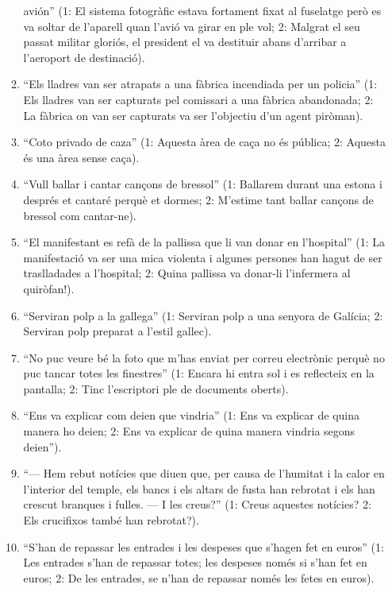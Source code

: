 \begin{enumerate}
\begin{enumerate}
        avión'' (1: El sistema fotogràfic estava fortament fixat al
        fuselatge però es va soltar de l'aparell quan l'avió va girar
        en ple vol; 2: Malgrat el seu passat militar gloriós, el
        president el va destituir abans d'arribar a l'aeroport de
        destinació).
      \item ``Els lladres van ser atrapats a una fàbrica incendiada
      per un policia'' (1: Els lladres van ser capturats pel comissari
      a una fàbrica abandonada; 2: La fàbrica on van ser capturats va
      ser l'objectiu d'un agent piròman).
      \item ``Coto privado de caza'' (1: Aquesta àrea de caça no és pública;
      2: Aquesta és una àrea sense caça).
    \item ``Vull ballar i cantar cançons de bressol'' (1: Ballarem
      durant una estona i després et cantaré perquè et dormes; 2:
      M'estime tant ballar cançons de bressol com cantar-ne).
      \item ``El manifestant es refà de la pallissa que li van donar en
      l'hospital'' (1: La manifestació va ser una mica violenta i
      algunes persones han hagut de ser traslladades a l'hospital; 2:
      Quina pallissa va donar-li l'infermera al quiròfan!).
      \item ``Serviran polp a la gallega'' (1: Serviran polp a una
        senyora de Galícia; 2: Serviran polp preparat a l'estil
        gallec).
      \item ``No puc veure bé la foto que m'has enviat per correu
        electrònic perquè no puc tancar totes les finestres'' (1:
        Encara hi entra sol i es reflecteix en la pantalla; 2: Tinc
        l'escriptori ple de documents oberts).
      \item ``Ens va explicar com deien que vindria'' (1: Ens va
        explicar de quina manera ho deien; 2: Ens va explicar de quina
        manera vindria segons deien'').
      \item ``--- Hem rebut notícies que diuen que, per causa de
        l'humitat i la calor en l'interior del temple, els bancs i els
        altars de fusta han rebrotat i els han crescut branques i
        fulles.  --- I les creus?'' (1: Creus aquestes notícies? 2:
        Els crucifixos també han rebrotat?).
      \item ``S'han de repassar les entrades i les despeses que
        s'hagen fet en euros'' (1: Les entrades s'han de repassar
        totes; les despeses només si s'han fet en euros; 2: De les
        entrades, se n'han de repassar només les fetes en euros).

\end{enumerate}
\end{enumerate}
